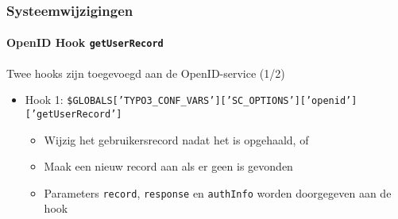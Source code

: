 \begin{frame}[fragile]
	\frametitle{Systeemwijzigingen}
	\framesubtitle{OpenID Hook \texttt{getUserRecord}}

	\lstset{basicstyle=\tiny\ttfamily}

	Twee hooks zijn toegevoegd aan de OpenID-service (1/2)

		\begin{itemize}

			\item Hook 1:\newline
				\smaller\smaller
					\texttt{\$GLOBALS['TYPO3\_CONF\_VARS']['SC\_OPTIONS']['openid']['getUserRecord']}
				\normalsize

				\begin{itemize}
					\item Wijzig het gebruikersrecord nadat het is opgehaald, of
					\item Maak een nieuw record aan als er geen is gevonden
					\item Parameters \texttt{record}, \texttt{response} en \texttt{authInfo} worden doorgegeven aan de hook
				\end{itemize}

		\end{itemize}

\end{frame}

